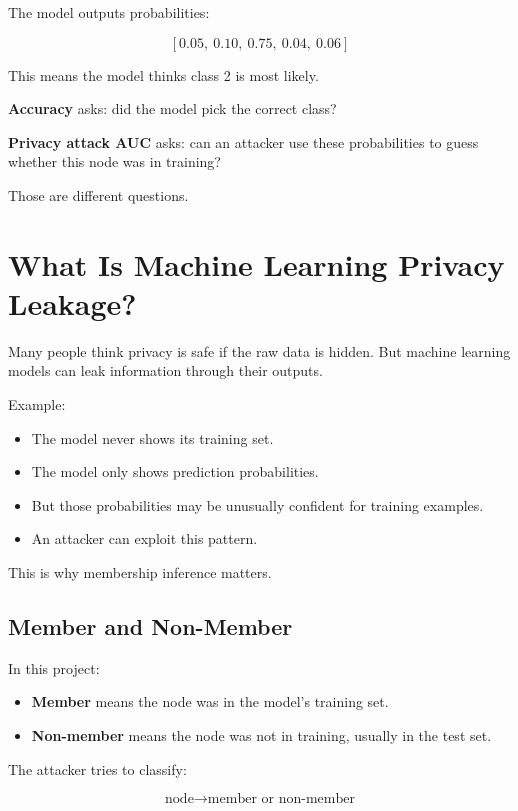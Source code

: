 \documentclass[11pt,a4paper]{article}
\begin{document}
The model outputs probabilities:

\[
\left[0.05,\ 0.10,\ 0.75,\ 0.04,\ 0.06\right]
\]

This means the model thinks class 2 is most likely.

\textbf{Accuracy} asks: did the model pick the correct class?

\textbf{Privacy attack AUC} asks: can an attacker use these probabilities to guess whether this node was in training?

Those are different questions.

\section{What Is Machine Learning Privacy Leakage?}

Many people think privacy is safe if the raw data is hidden. But machine learning models can leak information through their outputs.

Example:
\begin{itemize}
  \item The model never shows its training set.
  \item The model only shows prediction probabilities.
  \item But those probabilities may be unusually confident for training examples.
  \item An attacker can exploit this pattern.
\end{itemize}

This is why membership inference matters.

\subsection{Member and Non-Member}

In this project:

\begin{itemize}
  \item \textbf{Member} means the node was in the model's training set.
  \item \textbf{Non-member} means the node was not in training, usually in the test set.
\end{itemize}

The attacker tries to classify:

\[
\text{node} \rightarrow \text{member or non-member}
\]
\end{document}
